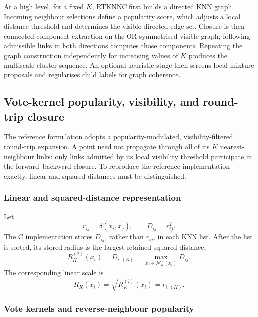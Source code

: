\documentclass[pdflatex,sn-basic,Numbered]{sn-jnl}
\newcommand{\calN}{\mathcal{N}}
\begin{document}
At a high level, for a fixed $K$, RTKNNC first builds a directed KNN graph.
Incoming neighbour selections define a popularity score, which adjusts a local
distance threshold and determines the visible directed edge set. Closure is
then connected-component extraction on the OR-symmetrised visible graph;
following admissible links in both directions computes those components.
Repeating the graph construction independently for increasing values of $K$
produces the multiscale cluster sequence. An optional heuristic stage then
screens local mixture proposals and regularises child labels for graph coherence.

\subsection{Vote-kernel popularity, visibility, and round-trip closure}\label{sec:visibility_closure}

The reference formulation adopts a popularity-modulated, visibility-filtered round-trip expansion. A point need not propagate through all of its $K$ nearest-neighbour links: only links admitted by its local visibility threshold participate in the forward--backward closure. To reproduce the reference implementation exactly, linear and squared distances must be distinguished.

\subsubsection{Linear and squared-distance representation}

Let
\begin{equation}
r_{ij}=\delta(x_i,x_j),
\qquad
D_{ij}=r_{ij}^{2}.
\label{eq:linear_squared_distance}
\end{equation}
The C implementation stores $D_{ij}$, rather than $r_{ij}$, in each KNN list. After the list is sorted, its stored radius is the largest retained squared distance,
\begin{equation}
R_K^{(2)}(x_i)=D_{i,(K)}
=\max_{x_j\in\calN_K^+(x_i)}D_{ij}.
\label{eq:squared_knn_radius}
\end{equation}
The corresponding linear scale is
\begin{equation}
R_K(x_i)=\sqrt{R_K^{(2)}(x_i)}=r_{i,(K)}.
\label{eq:linear_knn_radius}
\end{equation}

\subsubsection{Vote kernels and reverse-neighbour popularity}
\end{document}
